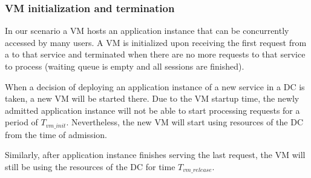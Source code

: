 \subsubsection{VM initialization and termination}
In our scenario a \ac{VM} hosts an application instance that can be concurrently accessed by many users.
A \ac{VM} is initialized upon receiving the first request from a \ue{} to that service and terminated when there are no more requests to that service to process (waiting queue is empty and all sessions are finished).

When a decision of deploying an application instance of a new service in a \ac{DC} is taken, a new \ac{VM} will be started there.
Due to the \ac{VM} startup time, the newly admitted application instance will not be able to start processing requests for a period of $T_{vm\_init}$. 
Nevertheless, the new \ac{VM} will start using resources of the \ac{DC} from the time of admission.

Similarly, after application instance finishes serving the last request, the \ac{VM} will still be using the resources of the \ac{DC} for time $T_{vm\_release}$.


